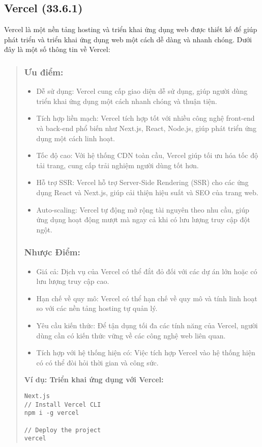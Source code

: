 \subsection{Vercel (33.6.1)}
Vercel là một nền tảng hosting và triển khai ứng dụng web được thiết kế để giúp phát triển và triển khai ứng dụng web một cách dễ dàng và nhanh chóng. Dưới đây là một số thông tin về Vercel:

\begin{quote}
\subsubsection{Ưu điểm:}
\begin{itemize}
  \item Dễ sử dụng: Vercel cung cấp giao diện dễ sử dụng, giúp người dùng triển khai ứng dụng một cách nhanh chóng và thuận tiện.
  \item Tích hợp liền mạch: Vercel tích hợp tốt với nhiều công nghệ front-end và back-end phổ biến như Next.js, React, Node.js, giúp phát triển ứng dụng một cách linh hoạt.
  \item Tốc độ cao: Với hệ thống CDN toàn cầu, Vercel giúp tối ưu hóa tốc độ tải trang, cung cấp trải nghiệm người dùng tốt hơn.
  \item Hỗ trợ SSR: Vercel hỗ trợ Server-Side Rendering (SSR) cho các ứng dụng React và Next.js, giúp cải thiện hiệu suất và SEO của trang web.
  \item Auto-scaling: Vercel tự động mở rộng tài nguyên theo nhu cầu, giúp ứng dụng hoạt động mượt mà ngay cả khi có lưu lượng truy cập đột ngột.
\end{itemize}

\subsubsection{Nhược Điểm:}
\begin{itemize}
  \item Giá cả: Dịch vụ của Vercel có thể đắt đỏ đối với các dự án lớn hoặc có lưu lượng truy cập cao.
  \item Hạn chế về quy mô: Vercel có thể hạn chế về quy mô và tính linh hoạt so với các nền tảng hosting tự quản lý.
  \item Yêu cầu kiến thức: Để tận dụng tối đa các tính năng của Vercel, người dùng cần có kiến thức vững về các công nghệ web liên quan.
  \item Tích hợp với hệ thống hiện có: Việc tích hợp Vercel vào hệ thống hiện có có thể đòi hỏi thời gian và công sức.
\end{itemize}

\textbf{Ví dụ: Triển khai ứng dụng với Vercel:}
\begin{lstlisting}
Next.js
// Install Vercel CLI
npm i -g vercel

// Deploy the project
vercel
\end{lstlisting}
\end{quote}



